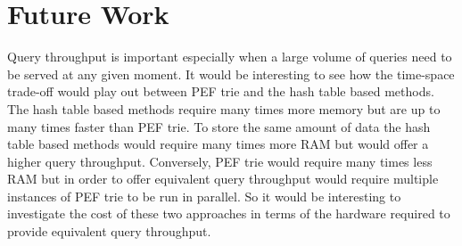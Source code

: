 \documentclass[sigconf, nonacm=true]{acmart}
\begin{document}
\section{Future Work}

Query throughput is important especially when a large volume of queries need to be served at any given moment. It would be interesting to see how the time-space trade-off would play out between PEF trie and the hash table based methods. The hash table based methods require many times more memory but are up to many times faster than PEF trie. To store the same amount of data the hash table based methods would require many times more RAM but would offer a higher query throughput. Conversely, PEF trie would require many times less RAM but in order to offer equivalent query throughput would require multiple instances of PEF trie to be run in parallel. So it would be interesting to investigate the cost of these two approaches in terms of the hardware required to provide equivalent query throughput.
\end{document}
